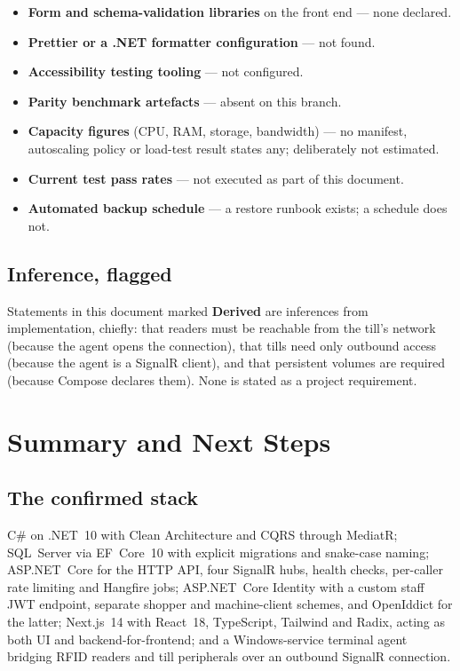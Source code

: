 \documentclass[11pt,a4paper]{report}
\newcommand{\vder}{\textcolor{r25data}{\textbf{Derived}}}
\begin{document}
\begin{itemize}[leftmargin=*,itemsep=2pt]
  \item \textbf{Form and schema-validation libraries} on the front end — none declared.
  \item \textbf{Prettier or a .NET formatter configuration} — not found.
  \item \textbf{Accessibility testing tooling} — not configured.
  \item \textbf{Parity benchmark artefacts} — absent on this branch.
  \item \textbf{Capacity figures} (CPU, RAM, storage, bandwidth) — no manifest, autoscaling policy
        or load-test result states any; deliberately not estimated.
  \item \textbf{Current test pass rates} — not executed as part of this document.
  \item \textbf{Automated backup schedule} — a restore runbook exists; a schedule does not.
\end{itemize}

\section{Inference, flagged}

Statements in this document marked \vder{} are inferences from implementation, chiefly: that
readers must be reachable from the till's network (because the agent opens the connection), that
tills need only outbound access (because the agent is a SignalR client), and that persistent
volumes are required (because Compose declares them). None is stated as a project requirement.

\chapter{Summary and Next Steps}
\label{ch:summary}

\section{The confirmed stack}

C\# on .NET~10 with Clean Architecture and CQRS through MediatR; SQL~Server via EF~Core~10 with
explicit migrations and snake-case naming; ASP.NET~Core for the HTTP API, four SignalR hubs,
health checks, per-caller rate limiting and Hangfire jobs; ASP.NET~Core Identity with a custom
staff JWT endpoint, separate shopper and machine-client schemes, and OpenIddict for the latter;
Next.js~14 with React~18, TypeScript, Tailwind and Radix, acting as both UI and
backend-for-frontend; and a Windows-service terminal agent bridging RFID readers and till
peripherals over an outbound SignalR connection.
\end{document}
